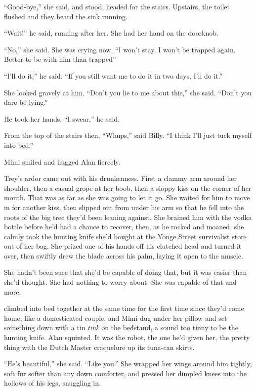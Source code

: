 ``Good-bye,'' she said, and stood, headed for the stairs.  Upstairs,
the toilet flushed and they heard the sink running.

``Wait!'' he said, running after her.  She had her hand on the
doorknob.

``No,'' she said.  She was crying now.  ``I won't stay.  I won't be
trapped again.  Better to be with him than trapped\dash{}''

``I'll do it,'' he said.  ``If you still want me to do it in two days,
I'll do it.''

She looked gravely at him.  ``Don't you lie to me about this,'' she
said.  ``Don't you dare be lying.''

He took her hands.  ``I swear,'' he said.

From the top of the stairs then, ``Whups,'' said Billy.  ``I think
I'll just tuck myself into bed.''

Mimi smiled and hugged Alan fiercely.

Trey's ardor came out with his drunkenness.  First a clammy arm around
her shoulder, then a casual grope at her boob, then a sloppy kiss on
the corner of her mouth.  That was as far as she was going to let it
go.  She waited for him to move in for another kiss, then slipped out
from under his arm so that he fell into the roots of the big tree
they'd been leaning against.  She brained him with the vodka bottle
before he'd had a chance to recover, then, as he rocked and moaned,
she calmly took the hunting knife she'd bought at the Yonge Street
survivalist store out of her bag.  She prized one of his hands off his
clutched head and turned it over, then swiftly drew the blade across
his palm, laying it open to the muscle.

She hadn't been sure that she'd be capable of doing that, but it was
easier than she'd thought.  She had nothing to worry about.  She was
capable of that and more.

 climbed into bed together at the same time for the first time
since they'd come home, like a domesticated couple, and Mimi dug under
her pillow and set something down with a tin \textit{tink} on the
bedstand, a sound too tinny to be the hunting knife.  Alan squinted. 
It was the robot, the one he'd given her, the pretty thing with the
Dutch Master craquelure up its tuna-can skirts.

``He's beautiful,'' she said.  ``Like you.'' She wrapped her wings
around him tightly, soft fur softer than any down comforter, and
pressed her dimpled knees into the hollows of his legs, snuggling in.

